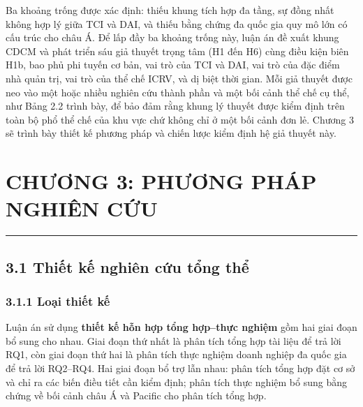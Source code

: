 \documentclass[
  a4paper,
  13pt]{extreport}
\begin{document}
Ba khoảng trống được xác định: thiếu khung tích hợp đa tầng, sự đồng
nhất không hợp lý giữa TCI và DAI, và thiếu bằng chứng đa quốc gia quy
mô lớn có cấu trúc cho châu Á. Để lấp đầy ba khoảng trống này, luận án
đề xuất khung CDCM và phát triển sáu giả thuyết trọng tâm (H1 đến H6)
cùng điều kiện biên H1b, bao phủ phi tuyến cơ bản, vai trò của TCI và
DAI, vai trò của đặc điểm nhà quản trị, vai trò của thể chế ICRV, và dị
biệt thời gian. Mỗi giả thuyết được neo vào một hoặc nhiều nghiên cứu
thành phần và một bối cảnh thể chế cụ thể, như Bảng 2.2 trình bày, để
bảo đảm rằng khung lý thuyết được kiểm định trên toàn bộ phổ thể chế của
khu vực chứ không chỉ ở một bối cảnh đơn lẻ. Chương 3 sẽ trình bày thiết
kế phương pháp và chiến lược kiểm định hệ giả thuyết này.

\newpage

\hypertarget{chux1b0ux1a1ng-3-phux1b0ux1a1ng-phuxe1p-nghiuxean-cux1ee9u}{%
\chapter{CHƯƠNG 3: PHƯƠNG PHÁP NGHIÊN
CỨU}\label{chux1b0ux1a1ng-3-phux1b0ux1a1ng-phuxe1p-nghiuxean-cux1ee9u}}

\begin{center}\rule{0.5\linewidth}{0.5pt}\end{center}

\hypertarget{thiux1ebft-kux1ebf-nghiuxean-cux1ee9u-tux1ed5ng-thux1ec3}{%
\section{3.1 Thiết kế nghiên cứu tổng
thể}\label{thiux1ebft-kux1ebf-nghiuxean-cux1ee9u-tux1ed5ng-thux1ec3}}

\hypertarget{loux1ea1i-thiux1ebft-kux1ebf}{%
\subsection{3.1.1 Loại thiết kế}\label{loux1ea1i-thiux1ebft-kux1ebf}}

Luận án sử dụng \textbf{thiết kế hỗn hợp tổng hợp--thực nghiệm} gồm hai
giai đoạn bổ sung cho nhau. Giai đoạn thứ nhất là phân tích tổng hợp tài
liệu để trả lời RQ1, còn giai đoạn thứ hai là phân tích thực nghiệm
doanh nghiệp đa quốc gia để trả lời RQ2--RQ4. Hai giai đoạn bổ trợ lẫn
nhau: phân tích tổng hợp đặt cơ sở và chỉ ra các biến điều tiết cần kiểm
định; phân tích thực nghiệm bổ sung bằng chứng về bối cảnh châu Á và
Pacific cho phân tích tổng hợp.
\end{document}
